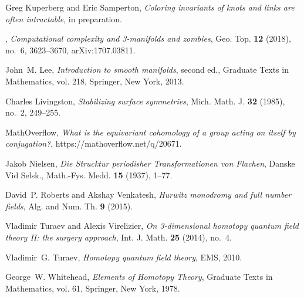 \documentclass[10pt,twocolumn,amsmath,amssymb,aps,pra,secnumarabic,
    nofootinbib,groupedaddress]{revtex4-1}
\begin{document}
\begin{thebibliography}{10}
Greg Kuperberg and Eric Samperton, \emph{Coloring invariants of knots and links
  are often intractable}, in preparation.

\bysame, \emph{Computational complexity and 3-manifolds and zombies}, Geo. Top. \textbf{12} (2018), no.~6, 3623--3670,
  {arXiv:1707.03811}.

John~M. Lee, \emph{Introduction to smooth manifolds}, second ed., Graduate
  Texts in Mathematics, vol. 218, Springer, New York, 2013.

Charles Livingston, \emph{Stabilizing surface symmetries}, Mich. Math. J.
  \textbf{32} (1985), no.~2, 249--255.

MathOverflow, \emph{What is the equivariant cohomology of a group acting on
  itself by conjugation?}, {https://mathoverflow.net/q/20671}.

Jakob Nielsen, \emph{{Die Strucktur periodisher Transformationen von Flachen}},
  Danske Vid Selsk., Math.-Fys. Medd. \textbf{15} (1937), 1--77.

David~P. Roberts and Akshay Venkatesh, \emph{Hurwitz monodromy and full number
  fields}, Alg. and Num. Th. \textbf{9} (2015).

Vladimir Turaev and Alexis Virelizier, \emph{On 3-dimensional homotopy quantum
  field theory {II:} the surgery approach}, Int. J. Math. \textbf{25} (2014),
  no.~4.

Vladimir~G. Turaev, \emph{Homotopy quantum field theory}, EMS, 2010.

George~W. Whitehead, \emph{Elements of Homotopy Theory}, Graduate Texts in Mathematics, vol. 61, Springer, New York, 1978.

\end{thebibliography}

\end{document}
